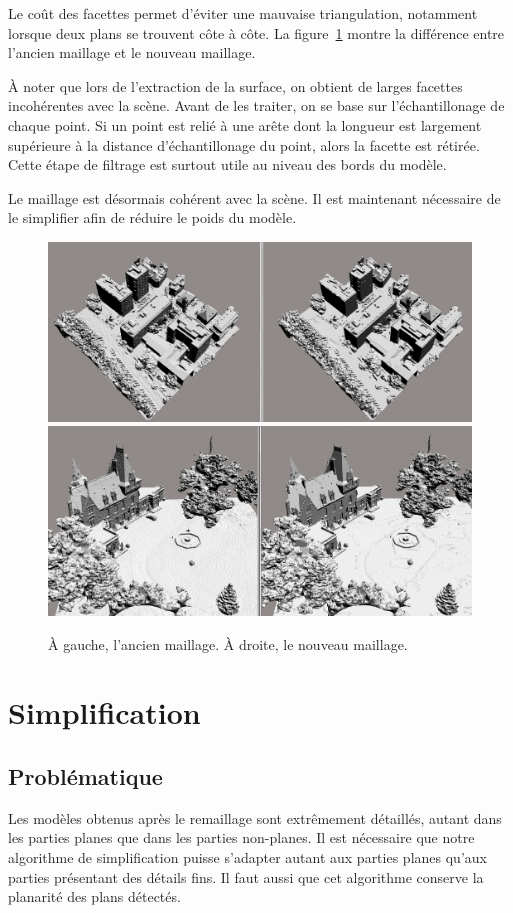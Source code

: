 ﻿\documentclass[12pt, twoside]{article}
\let\oldsection\section
\def\section{\cleardoublepage\oldsection}
\begin{document}
Le coût des facettes permet d'éviter une mauvaise triangulation, notamment lorsque deux plans se trouvent côte à côte. La figure~\ref{fig:avap} montre la différence entre l'ancien maillage et le nouveau maillage.

À noter que lors de l'extraction de la surface, on obtient de larges facettes incohérentes avec la scène. Avant de les traiter, on se base sur l'échantillonage de chaque point. Si un point est relié à une arête dont la longueur est largement supérieure à la distance d'échantillonage du point, alors la facette est rétirée. Cette étape de filtrage est surtout utile au niveau des bords du modèle.

Le maillage est désormais cohérent avec la scène. Il est maintenant nécessaire de le simplifier afin de réduire le poids du modèle.

\begin{figure}[h]
\centering
\includegraphics[scale=0.35]{Comparo4.png} \includegraphics[scale=0.34]{Comparo5.png} 
\caption{\label{fig:avap} À gauche, l'ancien maillage. À droite, le nouveau maillage.}
\end{figure}

\section{Simplification}
\subsection{Problématique}
Les modèles obtenus après le remaillage sont extrêmement détaillés, autant dans les parties planes que dans les parties non-planes. Il est nécessaire que notre algorithme de simplification puisse s'adapter autant aux parties planes qu'aux parties présentant des détails fins. Il faut aussi que cet algorithme conserve la planarité des plans détectés.
\end{document}
